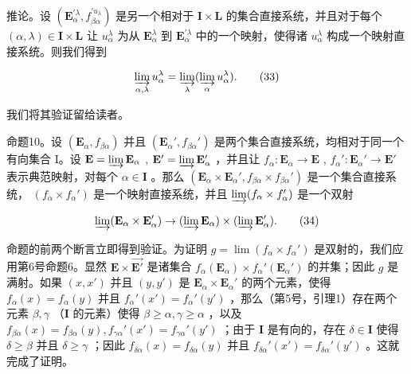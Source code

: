 推论。设 \((\mathbf{E}_{\alpha}^{\prime \lambda}, f_{\beta \alpha}^{\prime u_{\lambda}})\) 是另一个相对于 \(\mathbf{I} \times \mathbf{L}\) 的集合直接系统，并且对于每个 \((\alpha, \lambda) \in \mathbf{I} \times \mathbf{L}\) 让 \(u_{\alpha}^{\lambda}\) 为从 \(\mathbf{E}_{\alpha}^{\lambda}\) 到 \(\mathbf{E}_{\alpha}^{\prime \lambda}\) 中的一个映射，使得诸 \(u_{\alpha}^{\lambda}\) 构成一个映射直接系统。则我们得到

\[
\varinjlim_ {\alpha , \lambda} u _ {\alpha} ^ {\lambda} = \varinjlim_ {\lambda} (\varinjlim_ {\alpha} u _ {\alpha} ^ {\lambda}).\tag{33}
\]

我们将其验证留给读者。

命题10。设 \((\mathbf{E}_{\alpha}, f_{\beta \alpha})\) 并且 \((\mathbf{E}_{\alpha}', f_{\beta \alpha}')\) 是两个集合直接系统，均相对于同一个有向集合 I。设 \(\mathbf{E} = \varinjlim \mathbf{E}_{\alpha}\) , \(\mathbf{E}' = \varinjlim \mathbf{E}_{\alpha}'\) ，并且让 \(f_{\alpha}: \mathbf{E}_{\alpha} \to \mathbf{E}\) , \(f_{\alpha}': \mathbf{E}_{\alpha}' \to \mathbf{E}'\) 表示典范映射，对每个 \(\alpha \in \mathbf{I}\) 。那么 \((\mathbf{E}_{\alpha} \times \mathbf{E}_{\alpha}', f_{\beta \alpha} \times f_{\beta \alpha}')\) 是一个集合直接系统， \((f_{\alpha} \times f_{\alpha}')\) 是一个映射直接系统，并且 \(\varinjlim (f_{\alpha} \times f_{\alpha}')\) 是一个双射

\[
\varinjlim (\mathbf {E} _ {\alpha} \times \mathbf {E} _ {\alpha} ^ {\prime}) \rightarrow (\varinjlim \mathbf {E} _ {\alpha}) \times (\varinjlim \mathbf {E} _ {\alpha} ^ {\prime}).\tag{34}
\]

命题的前两个断言立即得到验证。为证明 \(g = \lim (f_{\alpha} \times f_{\alpha}')\) 是双射的，我们应用第6号命题6。显然 \(\mathbf{E} \times \overrightarrow{\mathbf{E}'}\) 是诸集合 \(f_{\alpha}(\mathbf{E}_{\alpha}) \times f_{\alpha}'(\mathbf{E}_{\alpha}')\) 的并集；因此 \(g\) 是满射。如果 \((x, x')\) 并且 \((y, y')\) 是 \(\mathbf{E}_{\alpha} \times \mathbf{E}_{\alpha}'\) 的两个元素，使得 \(f_{\alpha}(x) = f_{\alpha}(y)\) 并且 \(f_{\alpha}'(x') = f_{\alpha}'(y')\) ，那么（第5号，引理1）存在两个元素 \(\beta, \gamma\) （\(\mathbf{I}\) 的元素）使得 \(\beta \geqslant \alpha, \gamma \geqslant \alpha\) ，以及 \(f_{\beta \alpha}(x) = f_{\beta \alpha}(y), f_{\gamma \alpha}'(x') = f_{\gamma \alpha}'(y')\) ；由于 \(\mathbf{I}\) 是有向的，存在 \(\delta \in \mathbf{I}\) 使得 \(\delta \geqslant \beta\) 并且 \(\delta \geqslant \gamma\) ；因此 \(f_{\delta \alpha}(x) = f_{\delta \alpha}(y)\) 并且 \(f_{\delta \alpha}'(x') = f_{\delta \alpha}'(y')\) 。这就完成了证明。

